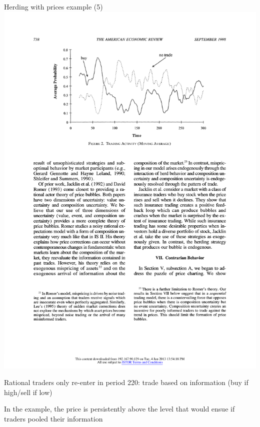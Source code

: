 \documentclass[english,10pt
,aspectratio=169
]{beamer}
\begin{document}
\begin{frame}{Herding with prices example (5)}
	\includegraphics[width=0.4\paperwidth]{pics/TradeInBubble}
	
	Rational traders only re-enter in period 220: trade based on information (buy if high/sell if low)
	
	In the example, the price is persistently above the level that would ensue if traders pooled their information \hfill \hyperlink{az}{}
\end{frame}
\end{document}
